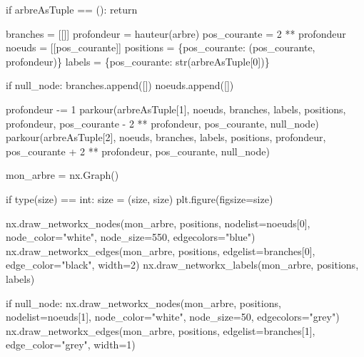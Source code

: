 \documentclass[
  letterpaper,
  DIV=11,
  numbers=noendperiod]{scrartcl}
\newenvironment{Shaded}{\begin{snugshade}}{\end{snugshade}}
\newcommand{\BuiltInTok}[1]{\textcolor[rgb]{0.00,0.23,0.31}{#1}}
\newcommand{\ControlFlowTok}[1]{\textcolor[rgb]{0.00,0.23,0.31}{#1}}
\newcommand{\DecValTok}[1]{\textcolor[rgb]{0.68,0.00,0.00}{#1}}
\newcommand{\NormalTok}[1]{\textcolor[rgb]{0.00,0.23,0.31}{#1}}
\newcommand{\OperatorTok}[1]{\textcolor[rgb]{0.37,0.37,0.37}{#1}}
\newcommand{\StringTok}[1]{\textcolor[rgb]{0.13,0.47,0.30}{#1}}
\begin{document}
\begin{tcolorbox}
\begin{Shaded}
\begin{Highlighting}[]
\ControlFlowTok{if}\NormalTok{ arbreAsTuple }\OperatorTok{==}\NormalTok{ ():}
    \ControlFlowTok{return}

\NormalTok{branches }\OperatorTok{=}\NormalTok{ [[]]}
\NormalTok{profondeur }\OperatorTok{=}\NormalTok{ hauteur(arbre)}
\NormalTok{pos\_courante }\OperatorTok{=} \DecValTok{2} \OperatorTok{**}\NormalTok{ profondeur}
\NormalTok{noeuds }\OperatorTok{=}\NormalTok{ [[pos\_courante]]}
\NormalTok{positions }\OperatorTok{=}\NormalTok{ \{pos\_courante: (pos\_courante, profondeur)\}}
\NormalTok{labels }\OperatorTok{=}\NormalTok{ \{pos\_courante: }\BuiltInTok{str}\NormalTok{(arbreAsTuple[}\DecValTok{0}\NormalTok{])\}}

\ControlFlowTok{if}\NormalTok{ null\_node:}
\NormalTok{    branches.append([])}
\NormalTok{    noeuds.append([])}

\NormalTok{profondeur }\OperatorTok{{-}=} \DecValTok{1}
\NormalTok{parkour(arbreAsTuple[}\DecValTok{1}\NormalTok{], noeuds, branches, labels, positions, profondeur, }
\NormalTok{        pos\_courante }\OperatorTok{{-}} \DecValTok{2} \OperatorTok{**}\NormalTok{ profondeur, pos\_courante, null\_node)}
\NormalTok{parkour(arbreAsTuple[}\DecValTok{2}\NormalTok{], noeuds, branches, labels, positions, profondeur, }
\NormalTok{        pos\_courante }\OperatorTok{+} \DecValTok{2} \OperatorTok{**}\NormalTok{ profondeur, pos\_courante, null\_node)}

\NormalTok{mon\_arbre }\OperatorTok{=}\NormalTok{ nx.Graph()}

\ControlFlowTok{if} \BuiltInTok{type}\NormalTok{(size) }\OperatorTok{==} \BuiltInTok{int}\NormalTok{:}
\NormalTok{    size }\OperatorTok{=}\NormalTok{ (size, size)}
\NormalTok{plt.figure(figsize}\OperatorTok{=}\NormalTok{size)}

\NormalTok{nx.draw\_networkx\_nodes(mon\_arbre, positions, nodelist}\OperatorTok{=}\NormalTok{noeuds[}\DecValTok{0}\NormalTok{], }
\NormalTok{                       node\_color}\OperatorTok{=}\StringTok{"white"}\NormalTok{, node\_size}\OperatorTok{=}\DecValTok{550}\NormalTok{, edgecolors}\OperatorTok{=}\StringTok{"blue"}\NormalTok{)}
\NormalTok{nx.draw\_networkx\_edges(mon\_arbre, positions, edgelist}\OperatorTok{=}\NormalTok{branches[}\DecValTok{0}\NormalTok{], }
\NormalTok{                       edge\_color}\OperatorTok{=}\StringTok{"black"}\NormalTok{, width}\OperatorTok{=}\DecValTok{2}\NormalTok{)}
\NormalTok{nx.draw\_networkx\_labels(mon\_arbre, positions, labels)}

\ControlFlowTok{if}\NormalTok{ null\_node:}
\NormalTok{    nx.draw\_networkx\_nodes(mon\_arbre, positions, nodelist}\OperatorTok{=}\NormalTok{noeuds[}\DecValTok{1}\NormalTok{], }
\NormalTok{                           node\_color}\OperatorTok{=}\StringTok{"white"}\NormalTok{, node\_size}\OperatorTok{=}\DecValTok{50}\NormalTok{, edgecolors}\OperatorTok{=}\StringTok{"grey"}\NormalTok{)}
\NormalTok{    nx.draw\_networkx\_edges(mon\_arbre, positions, edgelist}\OperatorTok{=}\NormalTok{branches[}\DecValTok{1}\NormalTok{], }
\NormalTok{                           edge\_color}\OperatorTok{=}\StringTok{"grey"}\NormalTok{, width}\OperatorTok{=}\DecValTok{1}\NormalTok{)}


\end{Highlighting}
\end{Shaded}
\end{tcolorbox}
\end{document}
